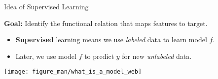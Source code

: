 \documentclass[11pt,compress,t,notes=noshow, xcolor=table]{beamer}
\begin{document}
	
\begin{vbframe}{Idea of Supervised Learning}


\textbf{Goal:} Identify the functional relation that maps features to target.

\lz

\begin{itemize}

  \item \textbf{Supervised} learning means we use \emph{labeled} data to learn model $f$. %
  


  \item Later, we use model $f$ to predict $y$ for 
  new \emph{unlabeled} data. %
  
\end{itemize}

\begin{center}
  \texttt{[image: figure\_man/what\_is\_a\_model\_web]} 
\end{center}
\end{vbframe}

\framebreak 




\end{document}
